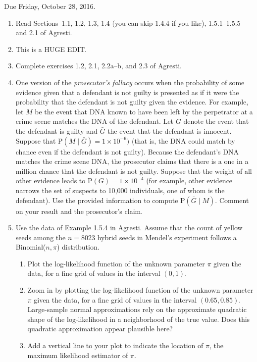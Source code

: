 \documentclass[12pt,epsf]{article}
\begin{document}

Due Friday, October 28, 2016.




\begin{enumerate}

\item Read Sections~1.1, 1.2, 1.3, 1.4 (you can skip 1.4.4 if you like), 1.5.1--1.5.5 and 2.1 of Agresti.

\item This is a HUGE EDIT.
\item Complete exercises 1.2, 2.1, 2.2a--b, and 2.3 of Agresti.

\item One version of the {\em prosecutor's fallacy} occurs when the probability of some evidence given that a defendant is not guilty is presented as if it were the probability that the defendant is not guilty given the evidence.  For example, let $M$ be the event that DNA known to have been left by the perpetrator at a crime scene matches the DNA of the defendant. Let $G$ denote the event that the defendant is guilty and $\bar G$ the event that the defendant is innocent.  Suppose that P$(M\mid\bar G)=1\times 10^{-6})$ (that is, the DNA could match by chance even if the defendant is not guilty).  Because the defendant's DNA matches the crime scene DNA, the prosecutor claims that there is a one in a million chance that the defendant is not guilty.  Suppose that the weight of all other evidence leads to P$(G)=1\times 10^{-4}$ (for example, other evidence narrows the set of suspects to 10,000 individuals, one of whom is the defendant).  Use the provided information to compute P$(\bar G\mid M)$.  Comment on your result and the prosecutor's claim.


 \item Use the data of Example 1.5.4 in Agresti.  Assume that the count of yellow seeds among the $n=8023$ hybrid seeds in Mendel's experiment follows a Binomial($n,\pi$) distribution.
     \begin{enumerate}
     \item Plot the log-likelihood function of the unknown parameter $\pi$ given the data, for a fine grid of values in the interval $(0,1)$.
     \item Zoom in by plotting the log-likelihood function of the unknown parameter $\pi$ given the data, for a fine grid of values in the interval $(0.65,0.85)$.  Large-sample normal approximations rely on the approximate quadratic shape of the log-likelihood in a neighborhood of the true value.  Does this quadratic approximation appear plausible here?
     \item Add a vertical line to your plot to indicate the location of $\widehat\pi$, the maximum likelihood estimator of $\pi$.


\end{enumerate}
\end{enumerate}
\end{document}
